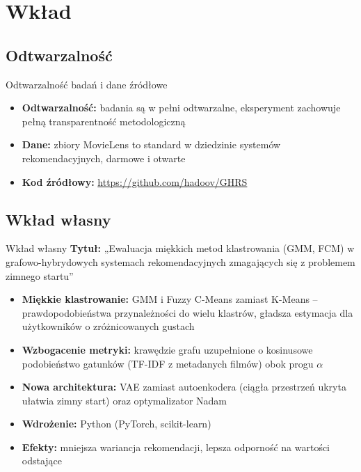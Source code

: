 \documentclass[red]{beamer}
\begin{document}
    \section{Wkład}
    \subsection{Odtwarzalność}
    \begin{frame}{Odtwarzalność badań i dane źródłowe}
        \begin{itemize}
            \item \textbf{Odtwarzalność:} badania są w pełni odtwarzalne, eksperyment zachowuje pełną transparentność metodologiczną
            \item \textbf{Dane:} zbiory MovieLens to standard w dziedzinie systemów rekomendacyjnych, darmowe i otwarte
            \item \textbf{Kod źródłowy:} \url{https://github.com/hadoov/GHRS}
        \end{itemize}
    \end{frame}

    \subsection{Wkład własny}
    \begin{frame}{Wkład własny}
        \footnotesize
        \textbf{Tytuł:} „Ewaluacja miękkich metod klastrowania (GMM, FCM) w grafowo-hybrydowych systemach rekomendacyjnych zmagających się z problemem zimnego startu”
        \begin{itemize}
            \item \textbf{Miękkie klastrowanie:} GMM i Fuzzy C-Means zamiast K-Means -- prawdopodobieństwa przynależności do wielu klastrów, gładsza estymacja dla użytkowników o zróżnicowanych gustach
            \item \textbf{Wzbogacenie metryki:} krawędzie grafu uzupełnione o kosinusowe podobieństwo gatunków (TF-IDF z metadanych filmów) obok progu $\alpha$
            \item \textbf{Nowa architektura:} VAE zamiast autoenkodera (ciągła przestrzeń ukryta ułatwia zimny start) oraz optymalizator Nadam
            \item \textbf{Wdrożenie:} Python (PyTorch, scikit-learn)
            \item \textbf{Efekty:} mniejsza wariancja rekomendacji, lepsza odporność na wartości odstające
        \end{itemize}
    \end{frame}
\end{document}
